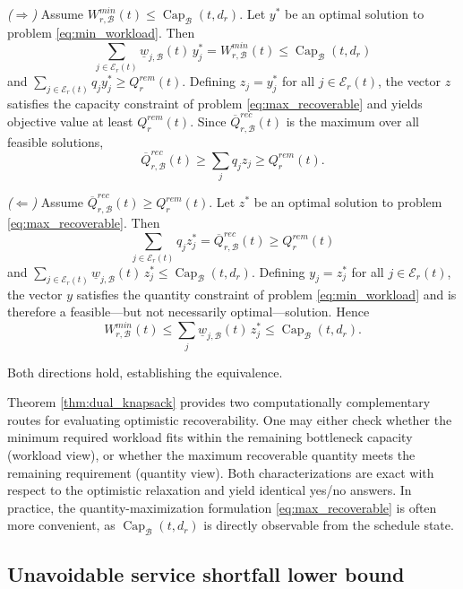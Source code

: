 \begin{pf}
\noindent\textit{($\Rightarrow$)} Assume $W_{r,\mathcal B}^{min}(t)\le\operatorname{Cap}_{\mathcal B}(t,d_r)$. Let $y^*$ be an optimal solution to problem \eqref{eq:min_workload}. Then
\[
\sum_{j\in\mathcal E_r(t)}\underline w_{j,\mathcal B}(t)\,y_j^*=W_{r,\mathcal B}^{min}(t)\le\operatorname{Cap}_{\mathcal B}(t,d_r)
\]
and $\sum_{j\in\mathcal E_r(t)}q_j y_j^*\ge Q_r^{rem}(t)$. Defining $z_j=y_j^*$ for all $j\in\mathcal E_r(t)$, the vector $z$ satisfies the capacity constraint of problem \eqref{eq:max_recoverable} and yields objective value at least $Q_r^{rem}(t)$. Since $\overline Q_{r,\mathcal B}^{rec}(t)$ is the maximum over all feasible solutions,
\[
\overline Q_{r,\mathcal B}^{rec}(t)\ge\sum_{j}q_j z_j\ge Q_r^{rem}(t).
\]

\medskip\noindent\textit{($\Leftarrow$)} Assume $\overline Q_{r,\mathcal B}^{rec}(t)\ge Q_r^{rem}(t)$. Let $z^*$ be an optimal solution to problem \eqref{eq:max_recoverable}. Then
\[
\sum_{j\in\mathcal E_r(t)}q_j z_j^*=\overline Q_{r,\mathcal B}^{rec}(t)\ge Q_r^{rem}(t)
\]
and $\sum_{j\in\mathcal E_r(t)}\underline w_{j,\mathcal B}(t)\,z_j^*\le\operatorname{Cap}_{\mathcal B}(t,d_r)$. Defining $y_j=z_j^*$ for all $j\in\mathcal E_r(t)$, the vector $y$ satisfies the quantity constraint of problem \eqref{eq:min_workload} and is therefore a feasible---but not necessarily optimal---solution. Hence
\[
W_{r,\mathcal B}^{min}(t)\le\sum_{j}\underline w_{j,\mathcal B}(t)\,z_j^*\le\operatorname{Cap}_{\mathcal B}(t,d_r).
\]

Both directions hold, establishing the equivalence.
\end{pf}

Theorem \ref{thm:dual_knapsack} provides two computationally complementary routes for evaluating optimistic recoverability. One may either check whether the minimum required workload fits within the remaining bottleneck capacity (workload view), or whether the maximum recoverable quantity meets the remaining requirement (quantity view). Both characterizations are exact with respect to the optimistic relaxation and yield identical yes/no answers. In practice, the quantity-maximization formulation \eqref{eq:max_recoverable} is often more convenient, as $\operatorname{Cap}_{\mathcal B}(t,d_r)$ is directly observable from the schedule state.

\subsection{Unavoidable service shortfall lower bound}
\label{sec:shortfall_lower_bound}

